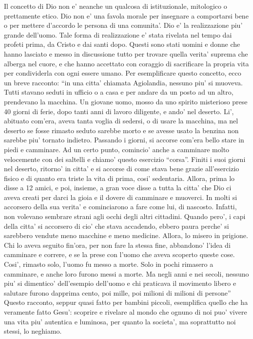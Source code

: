 Il concetto di Dio non e' neanche un qualcosa di istituzionale, mitologico o prettamente etico. Dio non e' una favola morale per insegnare a comportarsi bene o per mettere d'accordo le persona di una comunita'. Dio e' la realizzazione piu' grande dell'uomo. Tale forma di realizzazione e' stata rivelata nel tempo dai profeti prima, da Cristo  e dai santi dopo. Questi sono stati uomini e donne che hanno lasciato e messo in discussione tutto per trovare quella verita' suprema che alberga nel cuore, e che hanno accettato con coraggio di sacrificare la propria vita per condividerla con ogni essere umano.
Per esemplificare questo concetto, ecco un breve racconto: \enquote{in una citta' chiamata Agiolandia, nessuno piu' si muoveva. Tutti stavano seduti in ufficio o a casa e per andare da un posto ad un altro, prendevano la macchina. Un giovane uomo, mosso da uno spirito misterioso prese 40 giorni di ferie, dopo tanti anni di lavoro diligente, e ando' nel deserto. Li', abituato com'era, aveva tanta voglia di sedersi, o di usare la macchina, ma nel deserto se fosse rimasto seduto sarebbe morto e se avesse usato la benzina non sarebbe piu' tornato indietro. Passando i giorni, si accorse com'era bello stare in piedi e camminare. Ad un certo punto, comincio' anche a camminare molto velocemente con dei saltelli e chiamo' questo esercizio ``corsa''. Finiti i suoi giorni nel deserto, ritorno' in citta' e si accorse di come stava bene grazie all'esercizio fisico e di quanto era triste la vita di prima, cosi' sedentaria. Allora, prima lo disse a 12 amici, e poi, insieme, a gran voce disse a tutta la citta' che Dio ci aveva creati per darci la gioia e il dovere di camminare e muoverci. In molti si accorsero della sua verita' e cominciarono a fare come lui, di nascosto. Infatti, non volevano sembrare strani agli occhi degli altri cittadini. Quando pero', i capi della citta' si accorsero di cio' che stava accadendo, ebbero paura perche' si sarebbero vendute meno macchine e meno medicine. Allora, lo misero in prigione. Chi lo aveva seguito fin'ora, per non fare la stessa fine, abbandono' l'idea di camminare e correre, e se la prese con l'uomo che aveva scoperto queste cose. Cosi', rimasto solo, l'uomo fu messo a morte. Solo in pochi rimasero a camminare, e anche loro furono messi a morte. Ma negli anni e nei secoli, nessuno piu' si dimentico' dell'esempio dell'uomo e chi praticava il movimento libero e salutare furono dapprima cento, poi mille, poi milioni di milioni di persone}\\
Questo racconto, seppur quasi fatto per bambini piccoli, esemplifica quello che ha veramente fatto Gesu': scoprire e rivelare al mondo che ognuno di noi puo' vivere una vita piu' autentica e luminosa, per quanto la societa', ma soprattutto noi stessi, lo neghiamo.

